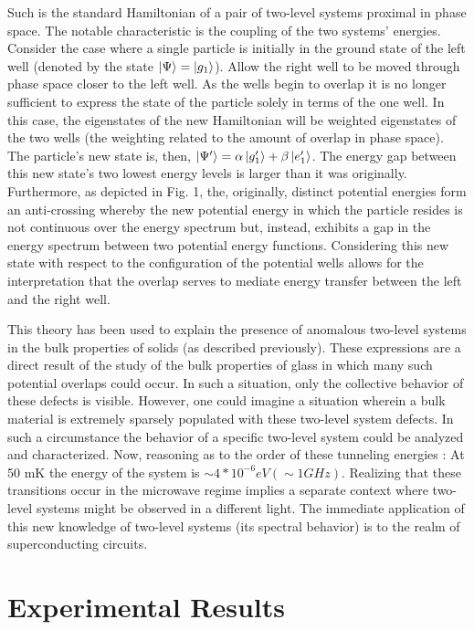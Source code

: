 \documentclass[aps,prl,reprint,groupedaddress]{revtex4-1}
\begin{document}
Such is the standard Hamiltonian of a pair of two-level systems proximal in phase space. The notable characteristic is the coupling of the two systems' energies. Consider the case where a single particle is initially in the ground state of the left well (denoted by the state $\ket{\Psi}=\ket{g_1}$). Allow the right well to be moved through phase space closer to the left well. As the wells begin to overlap it is no longer sufficient to express the state of the particle solely in terms of the one well. In this case, the eigenstates of the new Hamiltonian will be weighted eigenstates of the two wells (the weighting related to the amount of overlap in phase space). The particle's new state is, then, $\ket{\Psi'}=\alpha\ket{g'_1}+\beta\ket{e'_1}$. The energy gap between this new state's two lowest energy levels is larger than it was originally. Furthermore, as depicted in Fig. 1, the, originally, distinct potential energies form an anti-crossing whereby the new potential energy in which the particle resides is not continuous over the energy spectrum but, instead, exhibits a gap in the energy spectrum between two potential energy functions. Considering this new state with respect to the configuration of the potential wells allows for the interpretation that the overlap serves to mediate energy transfer between the left and the right well.

This theory has been used to explain the presence of anomalous two-level systems in the bulk properties of solids (as described previously). These expressions are a direct result of the study of the bulk properties of glass in which many such potential overlaps could occur. In such a situation, only the collective behavior of these defects is visible. However, one could imagine a situation wherein a bulk material is extremely sparsely populated with these two-level system defects. In such a circumstance the behavior of a specific two-level system could be analyzed and characterized. Now, reasoning as to the order of these tunneling energies : At 50 mK the energy of the system is $\sim 4*10^{-6}eV (\sim 1 GHz)$. Realizing that these transitions occur in the microwave regime implies a separate context where two-level systems might be observed in a different light. The immediate application of this new knowledge of two-level systems (its spectral behavior) is to the realm of superconducting circuits.

\section{Experimental Results}
\end{document}
